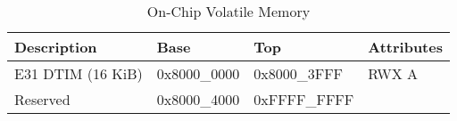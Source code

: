 \begin{table}[H]
    \centering
    \begin{tabular}{| p{4.5cm} | p{3cm} | p{3cm} | p{2.5cm} |}
        \hline
        \textbf{Description} & \textbf{Base} & \textbf{Top} & \textbf{Attributes}\\
        \hline
        \hline
        E31 DTIM (16 KiB) & 0x8000\_0000 & 0x8000\_3FFF & RWX A\\
        Reserved & 0x8000\_4000 & 0xFFFF\_FFFF & \\
        \hline
    \end{tabular}
    \caption{On-Chip Volatile Memory}
\end{table}